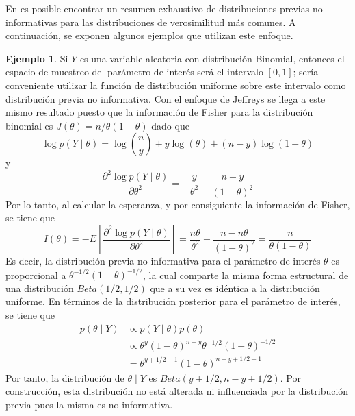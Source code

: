 \documentclass[
  10pt,
  spanish,
]{book}
\theoremstyle{definition}
\theoremstyle{definition}
\newtheorem{example}{Ejemplo}[chapter]
\theoremstyle{definition}
\theoremstyle{definition}
\theoremstyle{remark}
\begin{document}
En \citet[p.~59]{BoxTiao} es posible encontrar un resumen exhaustivo de distribuciones previas no informativas para las distribuciones de verosimilitud más comunes. A continuación, se exponen
algunos ejemplos que utilizan este enfoque.

\begin{example}
\protect\hypertarget{exm:unnamed-chunk-18}{}{\label{exm:unnamed-chunk-18} }Si \(Y\) es una variable aleatoria con distribución Binomial, entonces el espacio de muestreo del parámetro de interés será el intervalo \([0,1]\); sería conveniente utilizar la función de distribución uniforme sobre este intervalo como distribución previa no informativa. Con el enfoque de Jeffreys se llega a este mismo resultado puesto que la información de Fisher para la distribución binomial es \(J(\theta)=n/\theta(1- \theta)\) dado que
\begin{equation*}
\log p(Y \mid \theta)=\log \binom{n}{y} + y\log(\theta)+(n-y)\log(1-\theta)
\end{equation*}
y
\begin{equation*}
\frac{\partial^2 \log p(Y \mid \theta)}{\partial\theta^2}=-\frac{y}{\theta^2}-\frac{n-y}{(1-\theta)^2}
\end{equation*}
Por lo tanto, al calcular la esperanza, y por consiguiente la información de Fisher, se tiene que
\begin{equation*}
I(\theta)=- E\left[\frac{\partial^2 \log p(Y \mid \theta)}{\partial\theta^2}\right]
=\frac{n\theta}{\theta^2}+\frac{n-n\theta}{(1-\theta)^2}= \frac{n}{\theta(1-\theta)}
\end{equation*}
Es decir, la distribución previa no informativa para el parámetro de interés \(\theta\) es proporcional a \(\theta^{-1/2}(1-\theta)^{-1/2}\), la cual comparte la misma forma estructural de una distribución \(Beta(1/2,1/2)\) que a su vez es idéntica a la distribución uniforme. En términos de la distribución posterior para el parámetro de interés, se tiene que
\begin{align*}
p(\theta \mid Y) &\propto p(Y \mid \theta) p(\theta)\\
&\propto \theta^{y}(1-\theta)^{n-y}\theta^{-1/2}(1-\theta)^{-1/2}\\
&=\theta^{y+1/2-1}(1-\theta)^{n-y+1/2-1}
\end{align*}
Por tanto, la distribución de \(\theta \mid Y\) es \(Beta(y+1/2,n-y+1/2)\). Por construcción, esta distribución no está alterada ni influenciada por la distribución previa pues la misma es no informativa.
\end{example}
\end{document}
